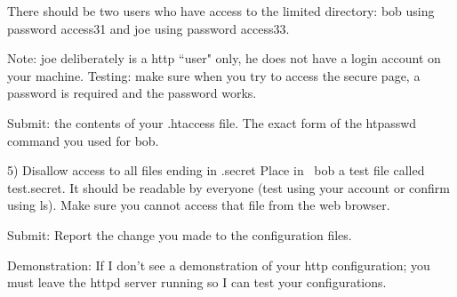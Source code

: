 There should be two users who have access to the {\ltt{}limited}
directory:
{\ltt{}bob} using password {\ltt{}access31}
and 
{\ltt{}joe} using password {\ltt{}access33}.

Note: {\ltt{}joe} deliberately is a http ``user" only,
he does not have a login account on your machine.
Testing: make sure when you try to access the secure page,
a password is required and the password works.

Submit: the contents of your {\ltt{}.htaccess} file.
The exact form of the {\ltt{}htpasswd} command you
used for {\ltt{}bob}.

5) Disallow access to all files ending in {\ltt{}.secret}
Place in {\ltt{}~bob} a test file called {\ltt{}test.secret}.
It should be readable by everyone (test using your account or confirm
using {\ltt{}ls}).
Make sure you cannot access that file from the web browser.

Submit: Report the change you made to the configuration files.

Demonstration: If I don't see a demonstration of your
http configuration; you must leave the {\ltt{}httpd} server
running so I can test your configurations.

\bye
